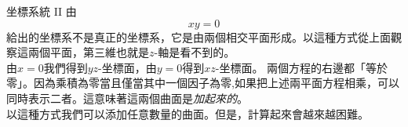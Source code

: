 \begin{surferPage}{坐標系統 II}
由\[xy=0\]給出的坐標系不是真正的坐標系，它是由兩個相交平面形成。以這種方式從上面觀察這兩個平面，第三維也就是$z$-軸是看不到的。
\\
\vspace{0.3cm}
由$x=0$我們得到$yz$-坐標面，由$y=0$得到$xz$-坐標面。
兩個方程的右邊都「等於零」。因為乘積為零當且僅當其中一個因子為零,如果把上述兩平面方程相乘，可以同時表示二者。這意味著這兩個曲面是\textit{加起來的}。\\
以這種方式我們可以添加任意數量的曲面。但是，計算起來會越來越困難。
\end{surferPage}

